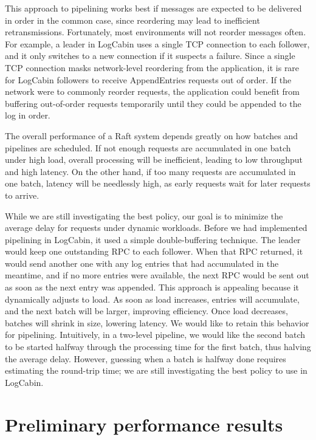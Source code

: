 This approach to pipelining works best if messages are expected to be
delivered in order in the common case, since reordering may lead to
inefficient retransmissions. Fortunately, most environments will not
reorder messages often. For example, a leader in LogCabin uses a single
TCP connection to each follower, and it only switches to a new
connection if it suspects a failure. Since a single TCP connection masks
network-level reordering from the application, it is rare for LogCabin
followers to receive AppendEntries requests out of order. If the network
were to commonly reorder requests, the application could benefit from
buffering out-of-order requests temporarily until they could be appended
to the log in order.

The overall performance of a Raft system depends greatly on how batches
and pipelines are scheduled. If not enough requests are accumulated in
one batch under high load, overall processing will be inefficient,
leading to low throughput and high latency. On the other hand, if too
many requests are accumulated in one batch, latency will be needlessly
high, as early requests wait for later requests to arrive.


While we are still investigating the best policy, our goal is to
minimize the average delay for requests under dynamic workloads. Before
we had implemented pipelining in LogCabin, it used a simple
double-buffering technique. The leader would keep one outstanding RPC to
each follower. When that RPC returned, it would send another one with
any log entries that had accumulated in the meantime, and if no more
entries were available, the next RPC would be sent out as soon as the
next entry was appended. This approach is appealing because it
dynamically adjusts to load. As soon as load increases, entries will
accumulate, and the next batch will be larger, improving efficiency.
Once load decreases, batches will shrink in size, lowering latency. We
would like to retain this behavior for pipelining. Intuitively, in a
two-level pipeline, we would like the second batch to be started halfway
through the processing time for the first batch, thus halving the
average delay. However, guessing when a batch is halfway done requires
estimating the round-trip time; we are still investigating the best
policy to use in LogCabin.


\section{Preliminary performance results}

